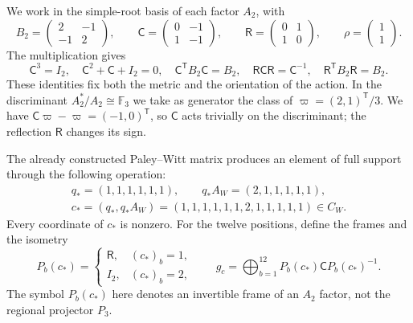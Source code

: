 We work in the simple-root basis of each factor \(A_2\), with
\begin{equation}
 B_2=\begin{pmatrix}2&-1\\-1&2\end{pmatrix},\qquad
 \mathsf C=\begin{pmatrix}0&-1\\1&-1\end{pmatrix},\qquad
 \mathsf R=\begin{pmatrix}0&1\\1&0\end{pmatrix},\qquad
 \rho=\begin{pmatrix}1\\1\end{pmatrix}.
 \label{x_reciprocidad:km:coxeter-reflexion}
\end{equation}
The multiplication gives
\[
 \mathsf C^3=I_2,\quad
 \mathsf C^2+\mathsf C+I_2=0,\quad
 \mathsf C^{\mathsf T}B_2\mathsf C=B_2,\quad
 \mathsf R\mathsf C\mathsf R=\mathsf C^{-1},\quad
 \mathsf R^{\mathsf T}B_2\mathsf R=B_2.
\]
These identities fix both the metric and the orientation of the action.
In the discriminant \(A_2^*/A_2\cong\mathbb F_3\) we take as
generator the class of \(\varpi=(2,1)^{\mathsf T}/3\). We have
\(\mathsf C\varpi-\varpi=(-1,0)^{\mathsf T}\), so
\(\mathsf C\) acts trivially on the discriminant; the reflection
\(\mathsf R\) changes its sign.

The already constructed Paley--Witt matrix produces an element of full
support through the following operation:
\begin{equation}
 \begin{gathered}
 q_*=(1,1,1,1,1,1),\qquad q_*A_W=(2,1,1,1,1,1),\\
 c_*=(q_*,q_*A_W)
 =(1,1,1,1,1,1,2,1,1,1,1,1)\in C_W.
 \end{gathered}
 \label{x_reciprocidad:km:palabra-total}
\end{equation}
Every coordinate of \(c_*\) is nonzero. For the twelve positions,
define the frames and the isometry
\begin{equation}
 P_b(c_*)=
 \begin{cases}\mathsf R,&(c_*)_b=1,\\I_2,&(c_*)_b=2,\end{cases}
 \qquad
 g_c=\bigoplus_{b=1}^{12}P_b(c_*)\mathsf C P_b(c_*)^{-1}.
 \label{x_reciprocidad:km:isometria-ternaria}
\end{equation}
The symbol \(P_b(c_*)\) here denotes an invertible frame of an
\(A_2\) factor, not the regional projector \(P_3\).

